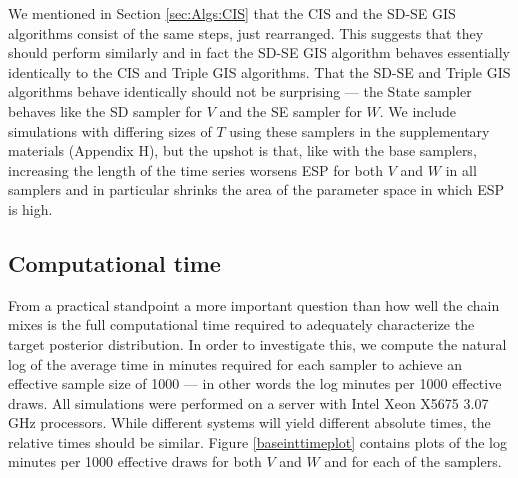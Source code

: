 \documentclass[12pt]{article}
\begin{document}
We mentioned in Section \ref{sec:Algs:CIS} that the CIS and the SD-SE GIS algorithms consist of the same steps, just rearranged. This suggests that they should perform similarly and in fact the SD-SE GIS algorithm behaves essentially identically to the CIS and Triple GIS algorithms. That the SD-SE and Triple GIS algorithms behave identically should not be surprising --- the State sampler behaves like the SD sampler for $V$ and the SE sampler for $W$.  We include simulations with differing sizes of $T$ using these samplers in the supplementary materials (Appendix H), but the upshot is that, like with the base samplers, increasing the length of the time series worsens ESP for both $V$ and $W$ in all samplers and in particular shrinks the area of the parameter space in which ESP is high.

\subsection{Computational time}\label{sec:LLM:time}

From a practical standpoint a more important question than how well the chain mixes is the full computational time required to adequately characterize the target posterior distribution. In order to investigate this, we compute the natural log of the average time in minutes required for each sampler to achieve an effective sample size of 1000 --- in other words the log minutes per 1000 effective draws. All simulations were performed on a server with Intel Xeon X5675 3.07 GHz processors. While different systems will yield different absolute times, the relative times should be similar. Figure \ref{baseinttimeplot} contains plots of the log minutes per 1000 effective draws for both $V$ and $W$ and for each of the samplers.
\end{document}
